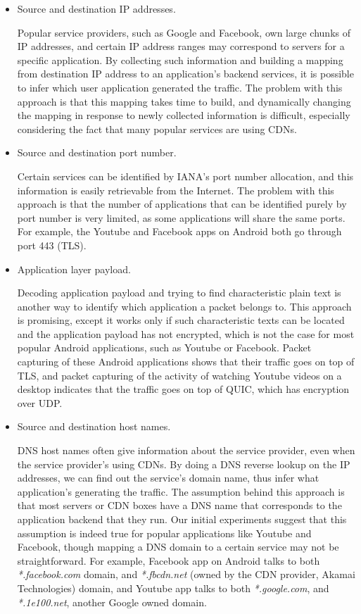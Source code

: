 \begin{itemize}
	
	\item Source and destination IP addresses. 
	
	Popular service providers, such as Google and Facebook, own large chunks of IP addresses, and certain IP address ranges may correspond to servers for a specific application. By collecting such information and building a  mapping from destination IP address to an application's backend services, it is possible to infer which user application generated the traffic. The problem with this approach is that this mapping takes time to build, and dynamically changing the mapping in response to newly collected information is difficult, especially considering the fact that many popular services are using CDNs.
	
	\item Source and destination port number. 
	
	Certain services can be identified by IANA's port number allocation, and this information is easily retrievable from the Internet. The problem with this approach is that the number of applications that can be identified purely by port number is very limited, as some applications will share the same ports. For example, the Youtube and Facebook apps on Android both go through port 443 (TLS).
	
	\item Application layer payload. 
	
	Decoding application payload and trying to find characteristic plain text is another way to identify which application a packet belongs to. This approach is promising, except it works only if such characteristic texts can be located and the application payload has not encrypted, which is not the case for most popular Android applications, such as Youtube or Facebook. Packet capturing of these Android applications shows that their traffic goes on top of TLS, and packet capturing of the activity of watching Youtube videos on a desktop indicates that the traffic goes on top of QUIC, which has encryption over UDP.
	
	\item Source and destination host names. 
	
	DNS host names often give information about the service provider, even when the service provider's using CDNs. By doing a DNS reverse lookup on the IP addresses, we can find out the service's domain name, thus infer what application's generating the traffic. The assumption behind this approach is that most servers or CDN boxes have a DNS name that corresponds to the application backend that they run. Our initial experiments suggest that this assumption is indeed true for popular applications like Youtube and Facebook, though mapping a DNS domain to a certain service may not be straightforward. For example, Facebook app on Android talks to both \textit{*.facebook.com} domain, and \textit{*.fbcdn.net} (owned by the CDN provider, Akamai Technologies) domain, and Youtube app talks to both \textit{*.google.com}, and \textit{*.1e100.net}, another Google owned domain. 
	

\end{itemize}
